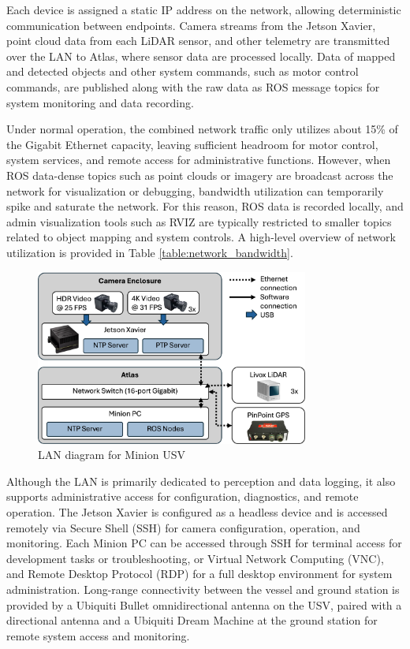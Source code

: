 \documentclass{erauthesis}
\begin{document}
Each device is assigned a static IP address on the network, allowing deterministic communication between endpoints.
Camera streams from the Jetson Xavier, point cloud data from each LiDAR sensor, and other telemetry are transmitted over the LAN to Atlas, where sensor data are processed locally.
Data of mapped and detected objects and other system commands, such as motor control commands, are published along with the raw data as \ac{ROS} message topics for system monitoring and data recording.

Under normal operation, the combined network traffic only utilizes about 15\% of the Gigabit Ethernet capacity, 
leaving sufficient headroom for motor control, system services, and remote access for administrative functions.
However, when \ac{ROS} data-dense topics such as point clouds or imagery are broadcast across the network for visualization or debugging, bandwidth utilization can temporarily spike and saturate the network.
For this reason, ROS data is recorded locally, and admin visualization tools such as RVIZ are typically restricted to smaller topics related to object mapping and system controls.
A high-level overview of network utilization is provided in Table \ref{table:network_bandwidth}.

\begin{figure}[htbp]
\centering
\includegraphics[width=0.8\textwidth]{Images/network_diagram2.png}
\caption{LAN diagram for Minion USV}
\label{fig:network_diagram}
\end{figure}

Although the LAN is primarily dedicated to perception and data logging, it also supports administrative access for configuration, diagnostics, and remote operation.
The Jetson Xavier is configured as a headless device and is accessed remotely via Secure Shell (SSH) for camera configuration, operation, and monitoring.
Each Minion PC can be accessed through SSH for terminal access for development tasks or troubleshooting, or Virtual Network Computing (VNC), and Remote Desktop Protocol (RDP) for a full desktop environment for system administration.
Long-range connectivity between the vessel and ground station is provided by a Ubiquiti Bullet omnidirectional antenna on the \ac{USV}, paired with a directional antenna and a Ubiquiti Dream Machine at the ground station for remote system access and monitoring.
\end{document}
